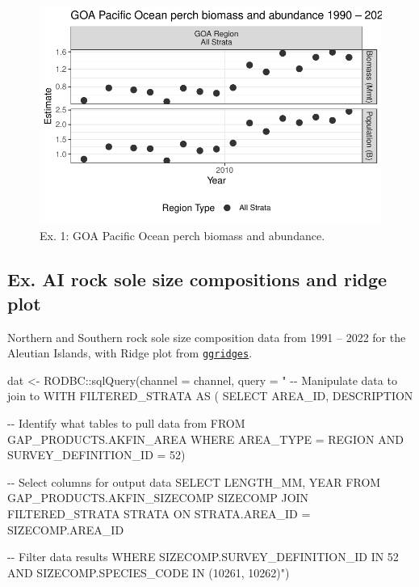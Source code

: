 \documentclass[
  letterpaper,
  oneside,
  open=any]{scrbook}
\newenvironment{Shaded}{\begin{snugshade}}{\end{snugshade}}
\newcommand{\AttributeTok}[1]{\textcolor[rgb]{0.40,0.45,0.13}{#1}}
\newcommand{\FunctionTok}[1]{\textcolor[rgb]{0.28,0.35,0.67}{#1}}
\newcommand{\NormalTok}[1]{\textcolor[rgb]{0.00,0.23,0.31}{#1}}
\newcommand{\OtherTok}[1]{\textcolor[rgb]{0.00,0.23,0.31}{#1}}
\newcommand{\SpecialCharTok}[1]{\textcolor[rgb]{0.37,0.37,0.37}{#1}}
\newcommand{\StringTok}[1]{\textcolor[rgb]{0.13,0.47,0.30}{#1}}
\begin{document}
\begin{figure}[H]

{\centering \includegraphics{content/akfin-oracle-sql-r_files/figure-pdf/test-1-plot-1.pdf}

}

\caption{Ex. 1: GOA Pacific Ocean perch biomass and abundance.}

\end{figure}

\hypertarget{ex.-ai-rock-sole-size-compositions-and-ridge-plot}{%
\subsection{Ex. AI rock sole size compositions and ridge
plot}\label{ex.-ai-rock-sole-size-compositions-and-ridge-plot}}

Northern and Southern rock sole size composition data from 1991 -- 2022
for the Aleutian Islands, with Ridge plot from
\href{https://cran.r-project.org/web/packages/ggridges/vignettes/introduction.html}{\texttt{ggridges}}.

\begin{Shaded}
\begin{Highlighting}[]
\NormalTok{dat }\OtherTok{\textless{}{-}}\NormalTok{ RODBC}\SpecialCharTok{::}\FunctionTok{sqlQuery}\NormalTok{(}\AttributeTok{channel =}\NormalTok{ channel, }
                       \AttributeTok{query =} 
                         \StringTok{"}
\StringTok{{-}{-} Manipulate data to join to}
\StringTok{WITH FILTERED\_STRATA AS (}
\StringTok{SELECT }
\StringTok{AREA\_ID, }
\StringTok{DESCRIPTION}

\StringTok{{-}{-} Identify what tables to pull data from}
\StringTok{FROM GAP\_PRODUCTS.AKFIN\_AREA}
\StringTok{WHERE AREA\_TYPE = \textquotesingle{}REGION\textquotesingle{} }
\StringTok{AND SURVEY\_DEFINITION\_ID = 52)}

\StringTok{{-}{-} Select columns for output data}
\StringTok{SELECT }
\StringTok{LENGTH\_MM, }
\StringTok{YEAR}
\StringTok{FROM GAP\_PRODUCTS.AKFIN\_SIZECOMP SIZECOMP}
\StringTok{JOIN FILTERED\_STRATA STRATA }
\StringTok{ON STRATA.AREA\_ID = SIZECOMP.AREA\_ID}

\StringTok{{-}{-} Filter data results}
\StringTok{WHERE SIZECOMP.SURVEY\_DEFINITION\_ID IN 52 }
\StringTok{AND SIZECOMP.SPECIES\_CODE IN (10261, 10262)"}\NormalTok{)}
\end{Highlighting}
\end{Shaded}
\end{document}
